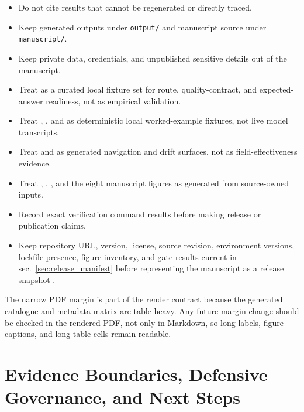 \documentclass[
]{article}
\providecommand{\tightlist}{%
  \setlength{\itemsep}{0pt}\setlength{\parskip}{0pt}}
\begin{document}
\begin{itemize}
\tightlist
\item
  Do not cite results that cannot be regenerated or directly traced.
\item
  Keep generated outputs under \texttt{output/} and manuscript source
  under \texttt{manuscript/}.
\item
  Keep private data, credentials, and unpublished sensitive details out
  of the manuscript.
\item
  Treat  as a curated local
  fixture set for route, quality-contract, and expected-answer
  readiness, not as empirical validation.
\item
  Treat ,
  , and
   as deterministic
  local worked-example fixtures, not live model transcripts.
\item
  Treat  and
   as generated navigation
  and drift surfaces, not as field-effectiveness evidence.
\item
  Treat ,
  ,
  , and the eight
   manuscript figures as generated from
  source-owned inputs.
\item
  Record exact verification command results before making release or
  publication claims.
\item
  Keep repository URL, version, license, source revision, environment
  versions, lockfile presence, figure inventory, and gate results
  current in sec.~\ref{sec:release_manifest} before representing the
  manuscript as a release snapshot \citep{smith2016softwareCitation}.
\end{itemize}

The narrow PDF margin is part of the render contract because the
generated catalogue and metadata matrix are table-heavy. Any future
margin change should be checked in the rendered PDF, not only in
Markdown, so long labels, figure captions, and long-table cells remain
readable.

\newpage

\section{Evidence Boundaries, Defensive Governance, and Next
Steps}\label{sec:limitations_next_steps}
\end{document}
